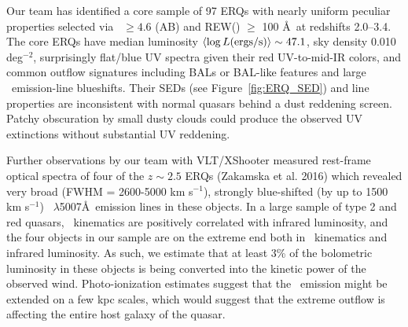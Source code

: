 \vspace{-22pt}
\noindent
Our team has identified a core sample of 97 ERQs with nearly uniform
peculiar properties selected via \imw\ $\ge 4.6$ (AB) and REW(\civ )
$\ge$ 100 \AA\ at redshifts 2.0--3.4.  The core ERQs have median
luminosity $\left<\log L ({\rm ergs/s})\right> \sim 47.1$, sky density
0.010 deg$^{-2}$, surprisingly flat/blue UV spectra given their red
UV-to-mid-IR colors, and common outflow signatures including BALs or
BAL-like features and large \civ\ emission-line blueshifts. Their
SEDs (see Figure~\ref{fig:ERQ_SED}) and line properties are
inconsistent with normal quasars behind a dust reddening
screen. Patchy obscuration by small dusty clouds could produce the
observed UV extinctions without substantial UV reddening.


\smallskip
\smallskip
\noindent
Further observations by our team with VLT/XShooter measured rest-frame
optical spectra of four of the $z\sim 2.5$ ERQs (Zakamska et al. 2016) 
which revealed very broad (FWHM = 2600-5000 km
s$^{-1}$), strongly blue-shifted (by up to 1500 km s$^{-1}$)
\oiii\ $\lambda$5007\AA\ emission lines in these objects. In a large
sample of type 2 and red quasars, \oiii\ kinematics are positively
correlated with infrared luminosity, and the four objects in our
sample are on the extreme end both in \oiii\ kinematics and infrared
luminosity.
As such, we estimate that at least 3\% of the bolometric luminosity in
these objects is being converted into the kinetic power of the
observed wind. Photo-ionization estimates suggest that the \oiii\ 
emission might be extended on a few kpc scales, which would suggest
that the extreme outflow is affecting the entire host galaxy of the
quasar.





